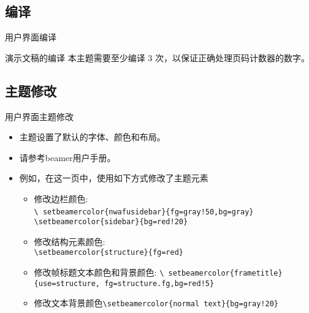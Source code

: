 \subsection{编译}
\begin{frame}{用户界面}{编译}
  \begin{block}{演示文稿的编译}
    本主题需要至少编译 \alert{3} 次，以保证正确处理页码计数器的数字。
  \end{block}
\end{frame}

\subsection{主题修改}
{
  \begin{frame}{用户界面}{主题修改}
    \begin{itemize}
    \item 主题设置了默认的字体、颜色和布局。
    \item 请参考beamer用户手册。
    \item 例如，在这一页中，使用如下方式修改了主题元素
      \begin{itemize}
      \item 修改边栏颜色:\\
        {\tt \textbackslash
          setbeamercolor\{nwafusidebar\}\{fg=gray!50,bg=gray\}} {\tt
          \textbackslash setbeamercolor\{sidebar\}\{bg=red!20\}}
      \item 修改结构元素颜色:\\
        {\tt \textbackslash setbeamercolor\{structure\}\{fg=red\}}\\
      \item 修改帧标题文本颜色和背景颜色: {\tt \textbackslash
          setbeamercolor\{frametitle\}\{use=structure,
          fg=structure.fg,bg=red!5\}}
      \item 修改文本背景颜色{\tt \textbackslash setbeamercolor\{normal
          text\}\{bg=gray!20\}}
      \end{itemize}
    \end{itemize}
  \end{frame}}

